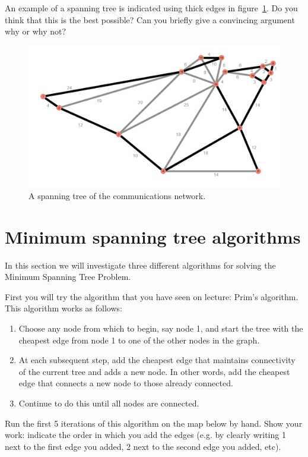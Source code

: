 \documentclass[fullpage,fleqn,leqno]{article}
\begin{document}
An example of a spanning tree is indicated using thick edges in
figure~\ref{fig:marked}. Do you think that this is the best possible?  Can you briefly give a convincing argument why or why not?


\begin{figure}[htp]
  \centering

  \includegraphics[width=\textwidth]{SampleTree.pdf}
  
  \caption{A spanning tree of the communications network.}
  \label{fig:marked}
\end{figure}


\newpage
\section{Minimum spanning tree algorithms}

In this section we will investigate three different algorithms for
solving the Minimum Spanning Tree Problem. 


First you will try the algorithm that you have seen on lecture: Prim's
algorithm. This algorithm works as follows:
\begin{enumerate}
\item Choose any node from which to begin, say node 1, and start the tree
with the cheapest edge from node 1 to one of the other nodes in the
graph.
\item At each subsequent step, add the cheapest edge that maintains
connectivity of the current tree and adds a new node. In other words,
add the cheapest edge that connects a new node to those already
connected.
\item Continue to do this until all nodes are connected.
\end{enumerate}

Run the first 5 iterations of this algorithm on the map below by hand. Show your work: indicate the order in which you
add the edges (e.g. by clearly writing 1 next to the first edge you added, 2 next to the second edge you added, etc).
\end{document}
